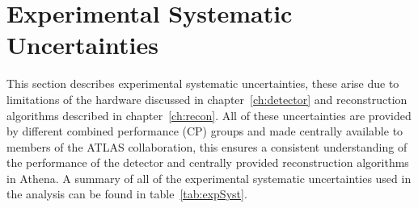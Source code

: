 



\section{Experimental Systematic Uncertainties}

This section describes experimental systematic uncertainties, these arise due to
limitations of the hardware discussed in chapter~\ref{ch:detector} and
reconstruction algorithms described in chapter~\ref{ch:recon}. All of these
uncertainties are provided by different combined performance (CP) groups and
made centrally available to members of the ATLAS collaboration, this ensures a
consistent understanding of the performance of the detector and centrally
provided reconstruction algorithms in Athena. A summary of all of the
experimental systematic uncertainties used in the analysis can be found in
table~\ref{tab:expSyst}.



